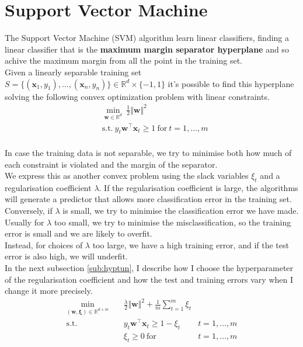 \newpage
\section{Support Vector Machine}
The Support Vector Machine (SVM) algorithm learn linear classifiers, finding a linear classifier that is the \textbf{maximum margin separator hyperplane} and so achive the maximum margin from all the point in the training set.\\

Given a linearly separable training set $S = \{(\boldsymbol{x}_1, y_1), \dots, (\boldsymbol{x}_n, y_n)\} \in \mathbb{R}^d \times \{-1, 1\}$ it's possible to find this hyperplane solving the following convex optimization problem with linear constraints.\\ 
\begin{align*} 
    & \underset{\boldsymbol{w} \in \mathbb{R}^d}{\min} \ \frac{1}{2} \Vert \boldsymbol{w} \Vert^2 \\
    & \text{s.t.} \ y_t \boldsymbol{w}^\top \boldsymbol{x}_t \geq 1 \ \text{for} \ t = 1, \dots, m 
\end{align*}\\


In case the training data is not separable, we try to minimise both how much of each constraint is violated and the margin of the separator.\\
We express this as another convex problem using the slack variables $\xi_t$ and a regularisation coefficient $\lambda$.
If the regularisation coefficient is large, the algorithms will generate a predictor that allows more classification error in the training set.\\
Conversely, if $\lambda$ is small, we try to minimise the classification error we have made.\\
Usually for $\lambda$ too small, we try to minimise the misclassification, so the training error is small and we are likely to overfit.\\
Instead, for choices of $\lambda$ too large, we have a high training error, and if the test error is also high, we will underfit. \\
In the next subsection \ref{sub:hyptun}, I describe how I choose the hyperparameter of the regularisation coefficient and how the test and training errors vary when I change it more precisely.\\ 

\begin{align*}
    \underset{(\boldsymbol{w}, \boldsymbol{\xi}) \in \mathbb{R}^{d+m}}{\min} \quad & \frac{\lambda}{2} \Vert \boldsymbol{w} \Vert^2 + \frac{1}{m} \sum_{t = 1}^m \xi_t \\
    \text{s.t.} \quad & y_t \boldsymbol{w}^\top \boldsymbol{x}_t \geq 1 - \xi_t & t = 1, \dots, m \\
    & \xi_t \geq 0 \ \text{for} & t = 1, \dots, m
\end{align*}

